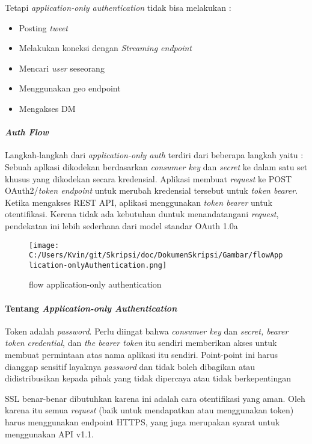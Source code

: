 Tetapi \textit{application-only authentication} tidak bisa melakukan :

\begin{itemize}
	\item Posting \textit{tweet}
	\item Melakukan koneksi dengan \textit{Streaming endpoint}
	\item Mencari \textit{user} seseorang
	\item Menggunakan geo endpoint
	\item Mengakses DM
\end{itemize}

\paragraph{\textit{Auth Flow}}
Langkah-langkah dari \textit{application-only auth} terdiri dari beberapa langkah yaitu :
Sebuah aplkasi dikodekan berdasarkan \textit{consumer key} dan \textit{secret} ke dalam satu set khusus yang dikodekan secara kredensial.
Aplikasi membuat \textit{request} ke POST OAuth2/\textit{token endpoint} untuk merubah kredensial tersebut untuk \textit{token bearer}.
Ketika mengakses REST API, aplikasi menggunakan \textit{token bearer} untuk otentifikasi.
Kerena tidak ada kebutuhan duntuk menandatangani \textit{request}, pendekatan ini lebih sederhana dari model standar OAuth 1.0a

\begin{figure}
	\centering
		\texttt{[image: C:/Users/Kvin/git/Skripsi/doc/DokumenSkripsi/Gambar/flowApplication-onlyAuthentication.png]}
	\caption{flow application-only authentication}
	\label{fig:flow application-only authentication}
\end{figure}


\paragraph{Tentang \textit{Application-only Authentication}}
Token adalah \textit{password}. Perlu diingat bahwa \textit{consumer key} dan \textit{secret, bearer token credential}, dan \textit{the bearer token} itu sendiri memberikan akses untuk membuat permintaan atas nama aplikasi itu sendiri. Point-point ini harus dianggap sensitif layaknya \textit{password} dan tidak boleh dibagikan atau didistribusikan kepada pihak yang tidak dipercaya atau tidak berkepentingan

SSL benar-benar dibutuhkan karena ini adalah cara otentifikasi yang aman. Oleh karena itu semua \textit{request} (baik untuk mendapatkan atau menggunakan token) harus menggunakan endpoint HTTPS, yang juga merupakan syarat untuk menggunakan API v1.1.

